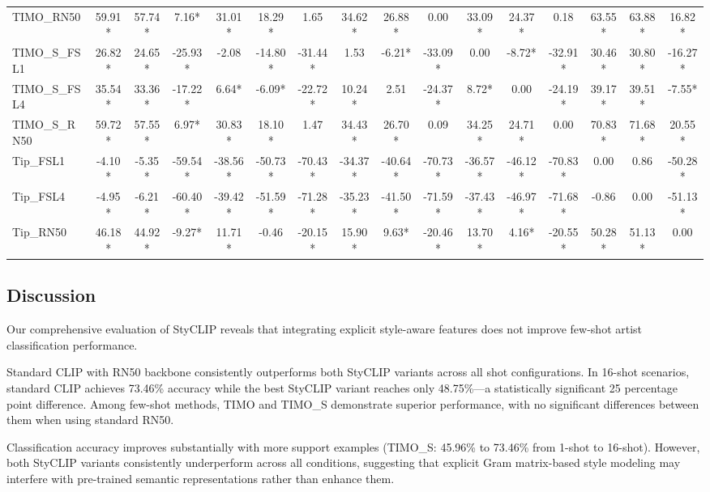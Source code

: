 \documentclass[conference,6pt]{IEEEtran}
\begin{document}
\begin{table}[H]
{\begin{tabular}{@{}l*{15}{c}@{}}
TIMO\_RN50 & 59.91* & 57.74* & 7.16* & 31.01* & 18.29* & 1.65 & 34.62* & 26.88* & 0.00 & 33.09* & 24.37* & 0.18 & 63.55* & 63.88* & 16.82* \\
TIMO\_S\_FSL1 & 26.82* & 24.65* & -25.93* & -2.08 & -14.80* & -31.44* & 1.53 & -6.21* & -33.09* & 0.00 & -8.72* & -32.91* & 30.46* &  30.80* & -16.27* \\
TIMO\_S\_FSL4 & 35.54* & 33.36* & -17.22* & 6.64* & -6.09* & -22.72* & 10.24* & 2.51 & -24.37* & 8.72* & 0.00 & -24.19* & 39.17* & 39.51* & -7.55* \\
TIMO\_S\_RN50 & 59.72* & 57.55* & 6.97* & 30.83* & 18.10* & 1.47 & 34.43* & 26.70* & 0.09 & 34.25* & 24.71* & 0.00 & 70.83* & 71.68* & 20.55* \\
Tip\_FSL1 & -4.10* & -5.35* & -59.54* & -38.56* & -50.73* & -70.43* & -34.37* & -40.64* & -70.73* & -36.57* & -46.12* & -70.83* & 0.00 & 0.86 & -50.28* \\
Tip\_FSL4 & -4.95* & -6.21* & -60.40* & -39.42* & -51.59* & -71.28* & -35.23* & -41.50* & -71.59* & -37.43* & -46.97* & -71.68* & -0.86 & 0.00 & -51.13* \\
Tip\_RN50 & 46.18* & 44.92* & -9.27* & 11.71* & -0.46 & -20.15* & 15.90* & 9.63* & -20.46* & 13.70* & 4.16* & -20.55* & 50.28* & 51.13* & 0.00 \\
\bottomrule
\end{tabular}%
}
\end{table}

\FloatBarrier
\clearpage

\subsection{Discussion}


Our comprehensive evaluation of StyCLIP reveals that integrating explicit style-aware features does not improve few-shot artist classification performance. 

Standard CLIP with RN50 backbone consistently outperforms both StyCLIP variants across all shot configurations. In 16-shot scenarios, standard CLIP achieves 73.46\% accuracy while the best StyCLIP variant reaches only 48.75\%—a statistically significant 25 percentage point difference. Among few-shot methods, TIMO and TIMO\_S demonstrate superior performance, with no significant differences between them when using standard RN50.

Classification accuracy improves substantially with more support examples (TIMO\_S: 45.96\% to 73.46\% from 1-shot to 16-shot). However, both StyCLIP variants consistently underperform across all conditions, suggesting that explicit Gram matrix-based style modeling may interfere with pre-trained semantic representations rather than enhance them.
\end{document}
